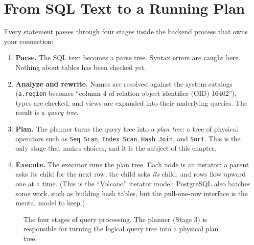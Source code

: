 \chapterline

\section{From SQL Text to a Running Plan}
\label{ch07:pipeline}

Every statement passes through four stages inside the backend process that owns your connection:

\begin{enumerate}
  \item \textbf{Parse.} The SQL text becomes a parse tree. Syntax errors are caught here. Nothing about tables has been checked yet.
  \item \textbf{Analyze and rewrite.} Names are resolved against the system catalogs (\texttt{a.region} becomes ``column 4 of relation object identifier (OID) 16402''), types are checked, and views are expanded into their underlying queries. The result is a \emph{query tree}.
  \item \textbf{Plan.} The planner turns the query tree into a \emph{plan tree}: a tree of physical operators such as \texttt{Seq Scan}, \texttt{Index Scan}, \texttt{Hash Join}, and \texttt{Sort}. This is the only stage that makes choices, and it is the subject of this chapter.
  \item \textbf{Execute.} The executor runs the plan tree. Each node is an iterator: a parent asks its child for the next row, the child asks \emph{its} child, and rows flow upward one at a time. (This is the ``Volcano'' iterator model; PostgreSQL also batches some work, such as building hash tables, but the pull-one-row interface is the mental model to keep.)
\end{enumerate}


\begin{figure}[H]
\centering
{}
\caption{The four stages of query processing. The planner (Stage 3) is responsible for turning the logical query tree into a physical plan tree.}
\label{ch07:fig-pipeline}
\end{figure}

